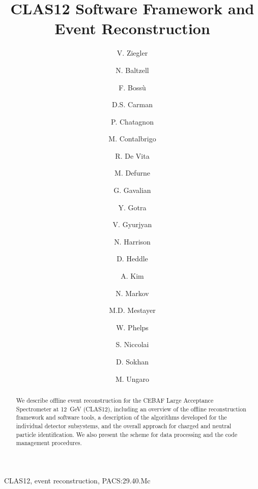 \documentclass[3p,times,twocolumn]{elsarticle}
\begin{document}
\begin{frontmatter}

\title{CLAS12 Software Framework and Event Reconstruction}

\author[JLab]{V. Ziegler}
\author[JLab]{N. Baltzell}
\author[Saclay]{F. Boss\`u}
\author[JLab]{D.S. Carman}
\author[IPNO]{P. Chatagnon}
\author[INFN]{M. Contalbrigo}
\author[INFN]{R. De Vita}
\author[Saclay]{M. Defurne}
\author[JLab]{G. Gavalian}
\author[JLab]{Y. Gotra}
\author[JLab]{V. Gyurjyan}
\author[JLab]{N. Harrison}
\author[CNU]{D. Heddle}
\author[UConn]{A. Kim}
\author[JLab]{N. Markov}
\author[JLab]{M.D. Mestayer}
\author[CNU]{W. Phelps}
\author[IPNO]{S. Niccolai}
\author[Glasgow]{D. Sokhan}
\author[JLab]{M. Ungaro}

\address[JLab]{Thomas Jefferson National Accelerator Facility, Newport News, VA 23606, USA}
\address[CNU]{Christopher Newport University, 1 Avenue of the Arts, Newport News, 23606 VA , USA}
\address[UConn]{University of Connecticut, Storrs, CT 06269, USA}
\address[INFN]{INFN, Sezione di Genova, 16146 Genova, Italy}
\address[Saclay]{CEA-Saclay, Univ. Paris-Sud, Universit\'e Paris-Saclay, Gif-sur-Yvettes, France}
\address[IPNO]{Institut de Physique Nucl\'eaire, CNRS-IN2P3, Univ. Paris-Sud, Universit\'e Paris-Saclay,
91406 Orsay Cedex, France}
\address[Glasgow]{University of Glasgow, Glasgow G12 8QQ, United Kingdom}



\begin{abstract}
  We describe offline event reconstruction for the CEBAF Large Acceptance Spectrometer at 12~GeV
  (CLAS12), including an overview of the offline reconstruction framework and software tools, a description
  of the algorithms developed for the individual detector subsystems, and the overall approach for charged
  and neutral particle identification. We also present the scheme for data processing and the code
  management procedures.
\end{abstract}

\begin{keyword}
CLAS12, event reconstruction, PACS:29.40.Mc
\end{keyword}

\end{frontmatter}
\end{document}
